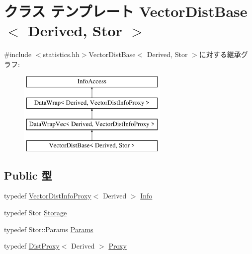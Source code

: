 \hypertarget{classStats_1_1VectorDistBase}{
\section{クラス テンプレート VectorDistBase$<$ Derived, Stor $>$}
\label{classStats_1_1VectorDistBase}
}


{\ttfamily \#include $<$statistics.hh$>$}VectorDistBase$<$ Derived, Stor $>$に対する継承グラフ:\begin{figure}[H]
\begin{center}
\leavevmode
\includegraphics[height=4cm]{classStats_1_1VectorDistBase}
\end{center}
\end{figure}
\subsection*{Public 型}
\begin{DoxyCompactItemize}
\item 
typedef \hyperlink{classStats_1_1VectorDistInfoProxy}{VectorDistInfoProxy}$<$ Derived $>$ \hyperlink{classStats_1_1VectorDistBase_a15ec5f8f1a2c998c2496fad068947481}{Info}
\item 
typedef Stor \hyperlink{classStats_1_1VectorDistBase_a5d4a6db0e7c32292f54a08d05c671bd1}{Storage}
\item 
typedef Stor::Params \hyperlink{classStats_1_1VectorDistBase_a24c5f88dc162c95e0b32ade67a7ea674}{Params}
\item 
typedef \hyperlink{classStats_1_1DistProxy}{DistProxy}$<$ Derived $>$ \hyperlink{classStats_1_1VectorDistBase_a9d0b15c55b5b57de51b840bbe83fc971}{Proxy}
\end{DoxyCompactItemize}

